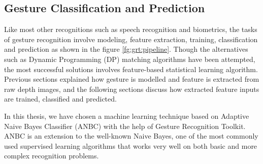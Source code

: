 \subsection{Gesture Classification and Prediction} Like most other recognitions such as speech recognition and biometrics, the tasks of gesture recognition involve modeling, feature extraction, training, classification and prediction as shown in the figure \ref{fg:grt:pipeline}. Though the alternatives such as Dynamic Programming (DP) matching algorithms have been attempted, the most successful solutions involves feature-based statistical learning algorithm. Previous sections explained how gesture is modelled and feature is extracted from raw depth images, and the following sections discuss how extracted feature inputs are trained, classified and predicted.

In this thesis, we have chosen a machine learning technique based on Adaptive Naive Bayes Classifier (ANBC) with the help of Gesture Recognition Toolkit. ANBC is an extension to the well-known Naive Bayes, one of the most commonly used supervised learning algorithms that works very well on both basic and more complex recognition problems.

 

